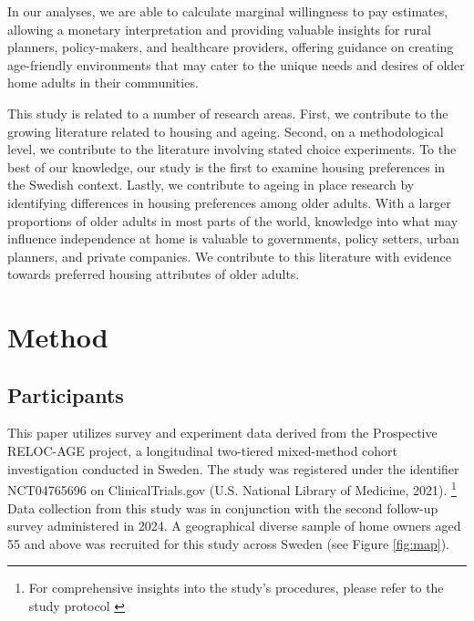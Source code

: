 \documentclass[3p,11pt ]{elsarticle}
\begin{document}
In our analyses, 
we are able to calculate marginal willingness to pay estimates,
allowing a monetary interpretation and providing valuable insights for rural planners, policy-makers, and healthcare providers, offering guidance on creating age-friendly environments that may cater to the unique needs and desires of older home adults in their communities.


This study is related to a number of research areas.
First,
we contribute to the growing literature related to housing and ageing.
Second,
on a methodological level, we contribute to the literature involving stated choice experiments.
To the best of our knowledge,
our study is the first to examine housing preferences in the Swedish context.
Lastly,
we contribute to ageing in place research by identifying differences in housing preferences among older adults.
With a larger proportions of older adults in most parts of the world,
knowledge into what may influence independence at home is valuable to governments, policy setters, urban planners, and private companies.
We contribute to this literature with evidence towards preferred housing attributes of older adults.





\section{Method}

\subsection{Participants}

This paper utilizes survey and experiment data derived from the Prospective RELOC-AGE project,
a longitudinal two-tiered mixed-method cohort investigation conducted in Sweden.
The study was registered under the identifier NCT04765696 on ClinicalTrials.gov (U.S. National Library of Medicine, 2021).
\footnote{For comprehensive insights into the study's procedures,
please refer to the study protocol  \cite{zingmarkExploringAssociationsHousing2021}}
Data collection from this study was in conjunction with the second follow-up survey administered in 2024.
A geographical diverse sample of home owners aged 55 and above was recruited for this study across Sweden (see Figure \ref{fig:map}).
\end{document}
